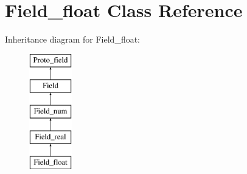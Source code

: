 \hypertarget{classField__float}{}\section{Field\+\_\+float Class Reference}
\label{classField__float}
Inheritance diagram for Field\+\_\+float\+:\begin{figure}[H]
\begin{center}
\leavevmode
\includegraphics[height=5.000000cm]{classField__float}
\end{center}
\end{figure}

